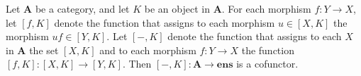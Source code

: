 Let $\mathbf{A}$ be a category, and let $K$ be an object in $\mathbf{A}$. For each morphism $f: Y \rightarrow X$, let $[f, K]$ denote the function that assigns to each morphism $u \in [X, K]$ the morphism $uf \in [Y, K]$. Let $[-, K]$ denote the function that assigns to each $X$ in $\mathbf{A}$ the set $[X, K]$ and to each morphism $f: Y \rightarrow X$ the function $[f, K]: [X, K] \rightarrow [Y, K]$. Then $[-, K]: \mathbf{A} \rightarrow \mathbf{ens}$ is a cofunctor.
